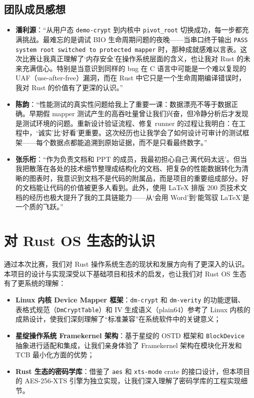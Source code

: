 \subsection{团队成员感想}

\begin{itemize}
    \item \textbf{潘利源}：“从用户态 \texttt{demo-crypt} 到内核中 \texttt{pivot\_root} 切换成功，每一步都充满挑战。最难忘的是调试 BIO 生命周期问题的夜晚——当串口终于输出 \texttt{PASS system root switched to protected mapper} 时，那种成就感难以言表。这次比赛让我真正理解了‘内存安全’在操作系统层面的含义，也让我对 Rust 的未来充满信心。特别是当意识到同样的 bug 在 C 语言中可能是一个难以复现的 UAF（use-after-free）漏洞，而在 Rust 中它只是一个生命周期编译错误时，我对 Rust 的价值有了更深的认识。”
    
    \item \textbf{陈韵}：“性能测试的真实性问题给我上了重要一课：数据漂亮不等于数据正确。早期假 mapper 测试产生的高吞吐量曾让我们兴奋，但冷静分析后才发现是测试环境的问题。重新设计验证流程、修复 runner 的过程让我明白：在工程中，‘诚实’比‘好看’更重要。这次经历也让我学会了如何设计可审计的测试框架——每个数据点都能追溯到原始证据，而不是只看最终数字。”
    
    \item \textbf{张乐桁}：“作为负责文档和 PPT 的成员，我最初担心自己‘离代码太远’。但当我把散落在各处的技术细节整理成结构化的文档、把复杂的性能数据转化为清晰的图表时，我意识到文档不是代码的附属品，而是项目的重要组成部分。好的文档能让代码的价值被更多人看到。此外，使用 LaTeX 排版 200 页技术文档的经历也极大提升了我的工具链能力——从‘会用 Word’到‘能驾驭 LaTeX’是一个质的飞跃。”
\end{itemize}

\section{对 Rust OS 生态的认识}

通过本次比赛，我们对 Rust 操作系统生态的现状和发展方向有了更深入的认识。本项目的设计与实现深受以下基础项目和技术的启发，也让我们对 Rust OS 生态有了更系统的理解：

\begin{itemize}
    \item \textbf{Linux 内核 Device Mapper 框架}：\texttt{dm-crypt} 和 \texttt{dm-verity} 的功能逻辑、表格式规范（\texttt{DmCryptTable}）和 IV 生成语义（plain64）参考了 Linux 内核的成熟设计，使我们深刻理解了“标准兼容”在系统软件中的关键意义；
    \item \textbf{星绽操作系统 Framekernel 架构}：基于星绽的 OSTD 框架和 \texttt{BlockDevice} 抽象进行适配和集成，让我们亲身体验了 Framekernel 架构在模块化开发和 TCB 最小化方面的优势；
    \item \textbf{Rust 生态的密码学库}：借鉴了 \texttt{aes} 和 \texttt{xts-mode} crate 的接口设计，但本项目的 AES-256-XTS 引擎为独立实现，让我们深入理解了密码学库的工程实现细节。
\end{itemize}

